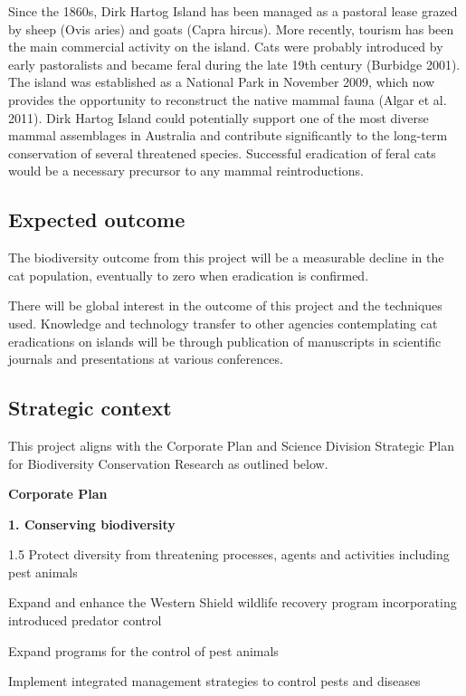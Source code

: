 \documentclass[version=last,
    paper=a4,                               %
    10pt,                                   %
    dvipsnames,
    oneside,                              %
    headings=openany,                       %
    open=any,
    BCOR=7mm,                               %
    DIV=15,     %
]{scrbook}
\begin{document}
Since the 1860s, Dirk Hartog Island has been managed as a pastoral lease
grazed by sheep (Ovis aries) and goats (Capra hircus). More recently,
tourism has been the main commercial activity on the island. Cats were
probably introduced by early pastoralists and became feral during the
late 19th century (Burbidge 2001). The island was established as a
National Park in November 2009, which now provides the opportunity to
reconstruct the native mammal fauna (Algar et al. 2011). Dirk Hartog
Island could potentially support one of the most diverse mammal
assemblages in Australia and contribute significantly to the long-term
conservation of several threatened species. Successful eradication of
feral cats would be a necessary precursor to any mammal reintroductions.




\subsection*{Expected outcome}

The biodiversity outcome from this project will be a measurable decline
in the cat population, eventually to zero when eradication is confirmed.

There will be global interest in the outcome of this project and the
techniques used. Knowledge and technology transfer to other agencies
contemplating cat eradications on islands will be through publication of
manuscripts in scientific journals and presentations at various
conferences.




\subsection*{Strategic context}

This project aligns with the Corporate Plan and Science Division
Strategic Plan for Biodiversity Conservation Research as outlined below.

\textbf{Corporate Plan}

\textbf{1. Conserving biodiversity}

1.5 Protect diversity from threatening processes, agents and activities
including pest animals

Expand and enhance the Western Shield wildlife recovery program
incorporating introduced predator control

Expand programs for the control of pest animals

Implement integrated management strategies to control pests and diseases
\end{document}
